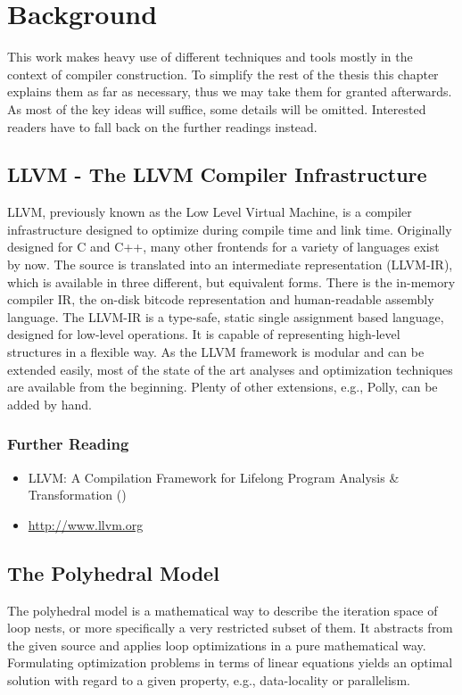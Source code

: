 \chapter{Background} %
\label{Chapter2}
This work makes heavy use of different techniques  and tools mostly 
in the context of compiler construction. To simplify the rest of the thesis 
this chapter explains them as far as necessary, thus we may take
them for granted afterwards. As most of the key ideas will suffice, 
some details will be omitted. 
Interested readers have to fall back on the further readings instead. 


\section{LLVM - The LLVM Compiler Infrastructure}
\label{LLVM}
LLVM, previously known as the Low Level Virtual Machine,
is a compiler infrastructure designed to optimize
during compile time and link time. Originally designed for C and C++, 
many other frontends for a variety of languages exist by now. The source is 
translated into an intermediate representation (LLVM-IR), which is available 
in three different, but equivalent forms. There is the in-memory compiler IR, 
the on-disk bitcode representation and human-readable assembly language.
The LLVM-IR is a type-safe, static single assignment based language,
designed for low-level operations. It is capable of 
representing high-level structures in a flexible way.
As the LLVM framework is modular and can be extended easily,
most of the state of the art analyses and
optimization techniques are available from the beginning. Plenty of other
extensions, e.g., Polly, can be added by hand. 


\subsection*{Further Reading}

\begin{itemize}
  \item LLVM: A Compilation Framework for Lifelong Program Analysis \& Transformation
    (\citet{LLVM:CGO04})
  \item \url{http://www.llvm.org} \nocite{LLVM:Online}
\end{itemize}


\clearpage
\section{The Polyhedral Model}
The polyhedral model is a mathematical way to describe the iteration space of 
loop nests, or more specifically a very restricted subset of them.
It abstracts from the given source and applies loop 
optimizations in a pure mathematical way. Formulating optimization problems 
in terms of linear equations yields an optimal solution with regard to a given
property, e.g., data-locality or parallelism.

